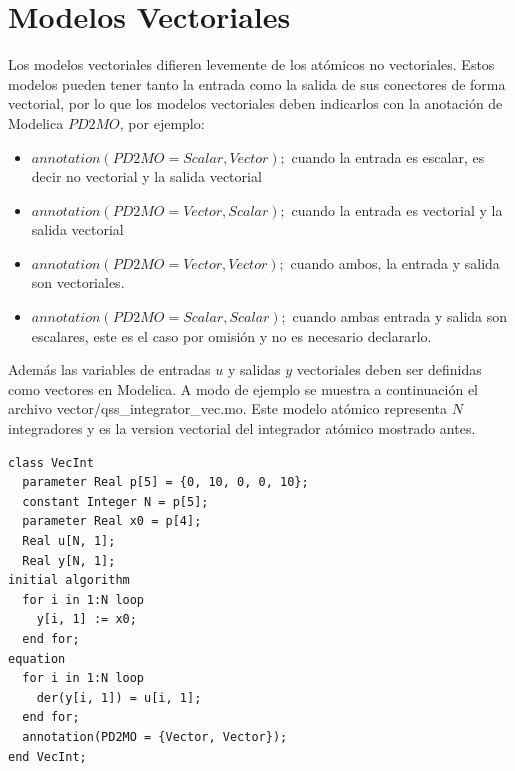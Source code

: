\documentclass[a4paper,	11pt]{report}
\begin{document}
\section{Modelos Vectoriales}
Los modelos vectoriales difieren levemente de los atómicos no vectoriales. Estos modelos pueden tener tanto la entrada como la salida de sus conectores de forma vectorial, por lo que los modelos vectoriales deben indicarlos con la anotación de Modelica $PD2MO$, por ejemplo:
\begin{itemize}
\item $annotation(PD2MO = {Scalar, Vector});$ cuando la entrada es escalar, es decir no vectorial y la salida vectorial
\item $annotation(PD2MO = {Vector, Scalar});$ cuando la entrada es vectorial y la salida vectorial
\item $annotation(PD2MO = {Vector, Vector});$ cuando ambos, la entrada y salida son vectoriales.
\item $annotation(PD2MO = {Scalar, Scalar});$ cuando ambas entrada y salida son escalares, este es el caso por omisión y no es necesario declararlo.
\end{itemize}

Además las variables de entradas $u$ y salidas $y$ vectoriales deben ser definidas como vectores en Modelica. A modo de ejemplo se muestra a continuación el archivo vector/qss\_integrator\_vec.mo. Este modelo atómico representa $N$ integradores y es la version vectorial del integrador atómico mostrado antes.

\begin{verbatim}
class VecInt
  parameter Real p[5] = {0, 10, 0, 0, 10};
  constant Integer N = p[5];
  parameter Real x0 = p[4];
  Real u[N, 1];
  Real y[N, 1];
initial algorithm
  for i in 1:N loop
    y[i, 1] := x0;
  end for;
equation
  for i in 1:N loop
    der(y[i, 1]) = u[i, 1];
  end for;
  annotation(PD2MO = {Vector, Vector});
end VecInt;
\end{verbatim}
\end{document}
